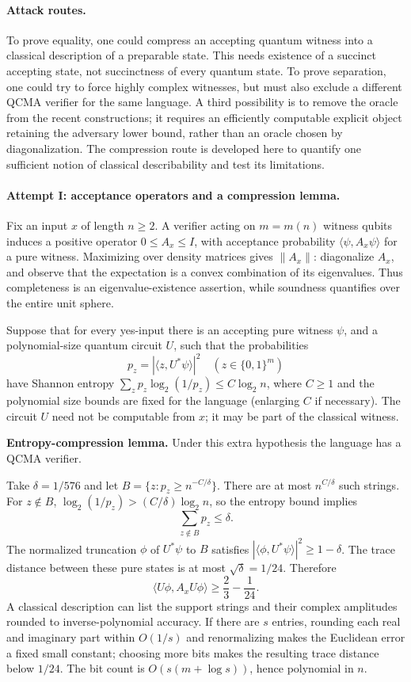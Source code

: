 \documentclass[11pt,a4paper]{article}
\numberwithin{equation}{section}
\begin{document}
\paragraph{Attack routes.}
To prove equality, one could compress an accepting quantum witness into
a classical description of a preparable state.  This needs existence
of a succinct accepting state, not succinctness of every quantum state.
To prove separation, one could try to force highly complex witnesses,
but must also exclude a different QCMA verifier for the same language.
A third possibility is to remove the oracle from the recent constructions;
it requires an efficiently computable explicit object retaining the
adversary lower bound, rather than an oracle chosen by diagonalization.
The compression route is developed here to quantify one sufficient
notion of classical describability and test its limitations.

\paragraph{Attempt I: acceptance operators and a compression lemma.}
Fix an input $x$ of length $n\geq2$.  A verifier acting on $m=m(n)$
witness qubits induces a positive operator $0\leq A_x\leq I$, with
acceptance probability $\langle\psi,A_x\psi\rangle$ for a pure witness.
Maximizing over density matrices gives $\|A_x\|$: diagonalize $A_x$,
and observe that the expectation is a convex combination of its
eigenvalues.  Thus completeness is an eigenvalue-existence assertion,
while soundness quantifies over the entire unit sphere.

Suppose that for every yes-input there is an accepting pure witness
$\psi$, and a polynomial-size quantum circuit $U$, such that the
probabilities
\[
 p_z=|\langle z,U^*\psi\rangle|^2
 \quad(z\in\{0,1\}^m)
\]
have Shannon entropy $\sum_zp_z\log_2(1/p_z)\leq C\log_2 n$, where
$C\geq1$ and the polynomial size bounds are fixed for the language
(enlarging $C$ if necessary).  The
circuit $U$ need not be computable from $x$; it may be part of the
classical witness.

\textbf{Entropy-compression lemma.} Under this extra hypothesis the
language has a QCMA verifier.

Take $\delta=1/576$ and let
$B=\{z:p_z\geq n^{-C/\delta}\}$.  There are at most
$n^{C/\delta}$ such strings.  For $z\notin B$,
$\log_2(1/p_z)>(C/\delta)\log_2 n$, so the entropy bound implies
\[
 \sum_{z\notin B}p_z\leq\delta.
\]
The normalized truncation $\phi$ of $U^*\psi$ to $B$ satisfies
$|\langle\phi,U^*\psi\rangle|^2\geq1-\delta$.  The trace distance
between these pure states is at most $\sqrt\delta=1/24$.  Therefore
\[
 \langle U\phi,A_xU\phi\rangle\geq\frac23-\frac1{24}.
\]
A classical description can list the support strings and their complex
amplitudes rounded to inverse-polynomial accuracy.  If there are $s$
entries, rounding each real and imaginary part within $O(1/s)$ and
renormalizing makes the Euclidean error a fixed small constant; choosing
more bits makes the resulting trace distance below $1/24$.
The bit count is $O(s(m+\log s))$, hence polynomial in $n$.
\end{document}
